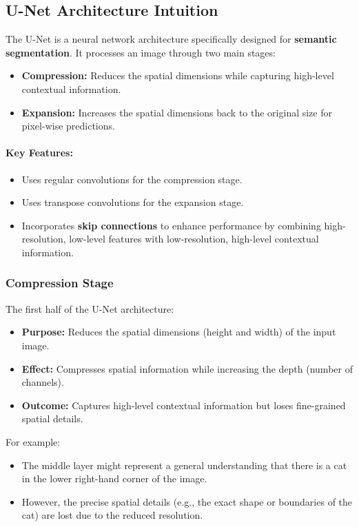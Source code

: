 \documentclass[letterpaper,12pt,notitlepage,twoside]{report}
\begin{document}
\subsection{U-Net Architecture Intuition}
The U-Net is a neural network architecture specifically designed for \textbf{semantic segmentation}. It processes an image through two main stages:
\begin{itemize}
    \item \textbf{Compression:} Reduces the spatial dimensions while capturing high-level contextual information.
    \item \textbf{Expansion:} Increases the spatial dimensions back to the original size for pixel-wise predictions.
\end{itemize}

\paragraph{Key Features:}
\begin{itemize}
    \item Uses regular convolutions for the compression stage.
    \item Uses transpose convolutions for the expansion stage.
    \item Incorporates \textbf{skip connections} to enhance performance by combining high-resolution, low-level features with low-resolution, high-level contextual information.
\end{itemize}

\subsubsection*{Compression Stage}

The first half of the U-Net architecture:
\begin{itemize}
    \item \textbf{Purpose:} Reduces the spatial dimensions (height and width) of the input image.
    \item \textbf{Effect:} Compresses spatial information while increasing the depth (number of channels).
    \item \textbf{Outcome:} Captures high-level contextual information but loses fine-grained spatial details.
\end{itemize}

For example:
\begin{itemize}
    \item The middle layer might represent a general understanding that there is a cat in the lower right-hand corner of the image.
    \item However, the precise spatial details (e.g., the exact shape or boundaries of the cat) are lost due to the reduced resolution.
\end{itemize}
\end{document}

